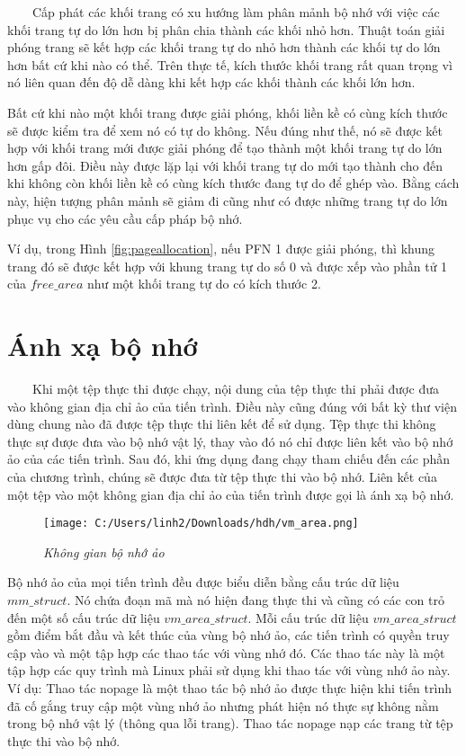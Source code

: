 \documentclass{article}
\begin{document}
~~~~Cấp phát các khối trang có xu hướng làm phân mảnh bộ nhớ với việc các khối trang tự do lớn hơn bị phân chia thành các khối nhỏ hơn. Thuật toán giải phóng trang sẽ kết hợp các khối trang tự do nhỏ hơn thành các khối tự do lớn hơn bất cứ khi nào có thể. Trên thực tế, kích thước khối trang rất quan trọng vì nó liên quan đến độ dễ dàng khi kết hợp các khối thành các khối lớn hơn.\vspace{1em}

Bất cứ khi nào một khối trang được giải phóng, khối liền kề có cùng kích thước sẽ được kiểm tra để xem nó có tự do không. Nếu đúng như thế, nó sẽ được kết hợp với khối trang mới được giải phóng để tạo thành một khối trang tự do lớn hơn gấp đôi. Điều này được lặp lại với khối trang tự do mới tạo thành cho đến khi không còn khối liền kề có cùng kích thước đang tự do để ghép vào. Bằng cách này, hiện tượng phân mảnh sẽ giảm đi cũng như có được những trang tự do lớn phục vụ cho các yêu cầu cấp pháp bộ nhớ.\vspace{1em}

Ví dụ, trong Hình \ref{fig:pageallocation}, nếu PFN 1 được giải phóng, thì khung trang đó sẽ được kết hợp với khung trang tự do số 0 và được xếp vào phần tử 1 của $free\_area$ như một khối trang tự do có kích thước 2.

\section{Ánh xạ bộ nhớ}

~~~~Khi một tệp thực thi được chạy, nội dung của tệp thực thi phải được đưa vào không gian địa chỉ ảo của tiến trình. Điều này cũng đúng với bất kỳ thư viện dùng chung nào đã được tệp thực thi liên kết để sử dụng. Tệp thực thi không thực sự được đưa vào bộ nhớ vật lý, thay vào đó nó chỉ được liên kết vào bộ nhớ ảo của các tiến trình. Sau đó, khi ứng dụng đang chạy tham chiếu đến các phần của chương trình, chúng sẽ được đưa từ tệp thực thi vào bộ nhớ. Liên kết của một tệp vào một không gian địa chỉ ảo của tiến trình được gọi là ánh xạ bộ nhớ.

\begin{figure}[H]
  \centering
  \texttt{[image: C:/Users/linh2/Downloads/hdh/vm\_area.png]}
  \caption{\textit{Không gian bộ nhớ ảo}}
  \label{fig:memorymapping}
\end{figure}

Bộ nhớ ảo của mọi tiến trình đều được biểu diễn bằng cấu trúc dữ liệu $mm\_struct$. Nó chứa đoạn mã mà nó hiện đang thực thi và cũng có các con trỏ đến một số cấu trúc dữ liệu $vm\_area\_struct$. Mỗi cấu trúc dữ liệu $vm\_area\_struct$ gồm điểm bắt đầu và kết thúc của vùng bộ nhớ ảo, các tiến trình có quyền truy cập vào và một tập hợp các thao tác với vùng nhớ đó. Các thao tác này là một tập hợp các quy trình mà Linux phải sử dụng khi thao tác với vùng nhớ ảo này. Ví dụ: Thao tác nopage là một thao tác bộ nhớ ảo được thực hiện khi tiến trình đã cố gắng truy cập một vùng nhớ ảo nhưng phát hiện nó thực sự không nằm trong bộ nhớ vật lý (thông qua lỗi trang). Thao tác nopage nạp các trang từ tệp thực thi vào bộ nhớ.\vspace{1em}
\end{document}
